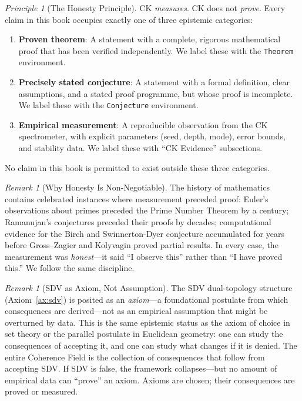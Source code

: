 \documentclass[12pt, openany]{book}
\theoremstyle{remark}
\newtheorem{remark}[theorem]{Remark}
\newtheorem{principle}[theorem]{Principle}
\begin{document}
\begin{principle}[The Honesty Principle]\label{princ:honesty}
CK \emph{measures}. CK does not \emph{prove}. Every claim in this book occupies
exactly one of three epistemic categories:
\begin{enumerate}
  \item \textbf{Proven theorem}: A statement with a complete, rigorous mathematical
        proof that has been verified independently. We label these with the
        \texttt{Theorem} environment.
  \item \textbf{Precisely stated conjecture}: A statement with a formal definition,
        clear assumptions, and a stated proof programme, but whose proof is
        incomplete. We label these with the \texttt{Conjecture} environment.
  \item \textbf{Empirical measurement}: A reproducible observation from the CK
        spectrometer, with explicit parameters (seed, depth, mode), error bounds,
        and stability data. We label these with ``CK Evidence'' subsections.
\end{enumerate}
No claim in this book is permitted to exist outside these three categories.
\end{principle}

\begin{remark}[Why Honesty Is Non-Negotiable]
The history of mathematics contains celebrated instances where measurement
preceded proof: Euler's observations about primes preceded the Prime Number
Theorem by a century; Ramanujan's conjectures preceded their proofs by decades;
computational evidence for the Birch and Swinnerton-Dyer conjecture accumulated
for years before Gross--Zagier and Kolyvagin proved partial results. In every
case, the measurement was \emph{honest}---it said ``I observe this'' rather than
``I have proved this.'' We follow the same discipline.
\end{remark}

\begin{remark}[SDV as Axiom, Not Assumption]
The SDV dual-topology structure (Axiom~\ref{ax:sdv}) is posited as an
\emph{axiom}---a foundational postulate from which consequences are derived---not
as an empirical assumption that might be overturned by data. This is the same
epistemic status as the axiom of choice in set theory or the parallel postulate
in Euclidean geometry: one can study the consequences of accepting it, and one
can study what changes if it is denied. The entire Coherence Field is the
collection of consequences that follow from accepting SDV. If SDV is false,
the framework collapses---but no amount of empirical data can ``prove'' an axiom.
Axioms are chosen; their consequences are proved or measured.
\end{remark}
\end{document}

